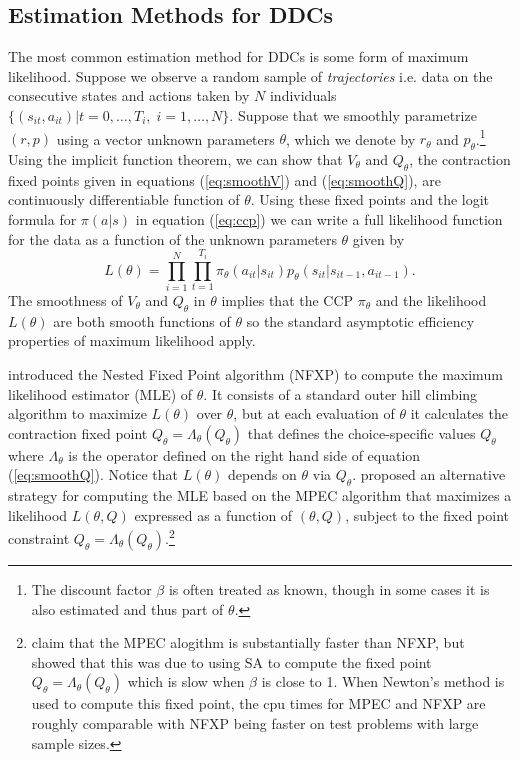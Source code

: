 \subsection{Estimation Methods for DDCs}

The most common estimation method for DDCs is some form of  maximum likelihood.
Suppose we observe a random sample of {\it trajectories\/} i.e. data on the  consecutive states and actions taken by
 $N$  individuals $\{(s_{it},a_{it})|t=0,\ldots,T_i, \; i=1,\ldots,N\}$. Suppose  
that we smoothly parametrize $(r,p)$ using a vector unknown parameters $\theta$, which we denote by
$r_\theta$ and $p_\theta$.\footnote{\footnotesize
The discount factor  $\beta$ is often treated as known, though in 
some cases it is also estimated and thus part of $\theta$.}  
Using the implicit function theorem, we can show that $V_\theta$ and $Q_\theta$, the contraction fixed points given in equations
(\ref{eq:smoothV}) and (\ref{eq:smoothQ}), are continuously differentiable function of $\theta$.
Using these fixed points and the logit formula for $\pi(a|s)$ in equation (\ref{eq:ccp}) we can  write a full  likelihood
function for the data as a function of the unknown parameters $\theta$ given by
\begin{equation}
    L(\theta) = \prod_{i=1}^N \prod_{t=1}^{T_i}  \pi_\theta(a_{it}|s_{it})p_\theta(s_{it}|s_{it-1},a_{it-1}).
\label{eq:lf}
\end{equation}
The smoothness of $V_\theta$ and $Q_\theta$ in $\theta$ implies that the CCP $\pi_\theta$ and the
likelihood $L(\theta)$ are both smooth functions of $\theta$ so the standard asymptotic
efficiency properties of maximum likelihood apply. 

\citet{rust:1988} introduced  the Nested Fixed Point algorithm (NFXP) to compute the maximum likelihood estimator (MLE) of $\theta$. It consists of a standard outer hill climbing algorithm to maximize $L(\theta)$ over $\theta$, but at each evaluation of $\theta$ it calculates
the contraction fixed point $Q_\theta=\Lambda_\theta(Q_\theta)$ that defines the choice-specific values $Q_\theta$ where $\Lambda_\theta$
is the operator defined on the right hand side of equation (\ref{eq:smoothQ}).
Notice that $L(\theta)$ depends on $\theta$ via $Q_\theta$. \citet{sujudd:2012} proposed an alternative strategy
for computing the MLE based on the MPEC algorithm that maximizes a likelihood $L(\theta,Q)$  expressed as  a function of $(\theta,Q)$, 
subject to the fixed point constraint $Q_\theta=\Lambda_\theta(Q_\theta)$.\footnote{\footnotesize \citet{sujudd:2012} claim that the
MPEC alogithm is substantially faster than NFXP, but  \citet{sujuddcomment:2016} showed that this was due to using SA to compute
the fixed point $Q_\theta=\Lambda_\theta(Q_\theta)$ which is slow when $\beta$ is close to 1. When Newton's method is used
to compute this fixed point, the cpu times for MPEC and NFXP are roughly comparable with NFXP being faster on test problems with
large sample sizes.}

